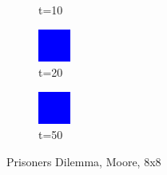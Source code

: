 \documentclass[a4paper, 11pt]{article}
\begin{document}
\begin{figure}[H]
\begin{subfigure}{.16\textwidth}
  \caption{t=10}
\end{subfigure}%
\begin{subfigure}{.16\textwidth}
  \centering
  \includegraphics[width=0.9\linewidth]{PRISONERS_DILEMMA_MOORE_8x8_t20}
  \caption{t=20}
\end{subfigure}%
\begin{subfigure}{.16\textwidth}
  \centering
  \includegraphics[width=0.9\linewidth]{PRISONERS_DILEMMA_MOORE_8x8_t50}
  \caption{t=50}
\end{subfigure}
\caption{Prisoners Dilemma, Moore, 8x8}
\end{figure}
\end{document}
